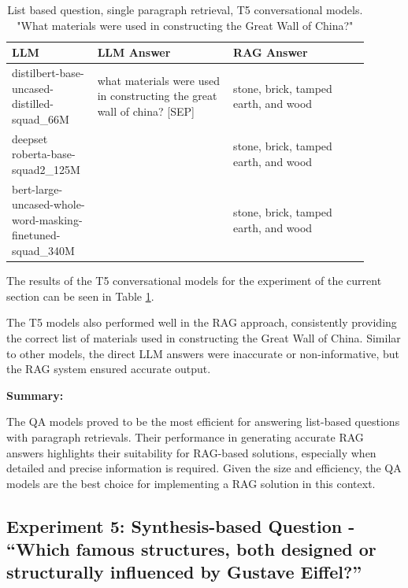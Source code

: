 \documentclass{wseas}
\begin{document}
\begin{table}[htbp]
  \centering
  \caption{List based question, single paragraph retrieval, T5 conversational models. "What materials were used in constructing the Great Wall of China?"}
  \label{tab:experiment_R_1_paragraph_Q_listBased_M_T5Models_table}  %
  \begin{tabular}{|p{0.20\linewidth}|p{0.35\linewidth}|p{0.35\linewidth}|}
    \hline
    \textbf{LLM} & \textbf{LLM Answer} & \textbf{RAG Answer} \\
    \hline
    distilbert-base-uncased-distilled-squad\_66M & what materials were used in constructing the great wall of china? {[}SEP{]} & stone, brick, tamped earth, and wood \\
    \hline
    deepset roberta-base-squad2\_125M & & stone, brick, tamped earth, and wood \\
    \hline
    bert-large-uncased-whole-word-masking-finetuned-squad\_340M & & stone, brick, tamped earth, and wood \\
    \hline
  \end{tabular}
\end{table}

The results of the T5 conversational models for the experiment of the
current section can be seen in Table \ref{tab:experiment_R_1_paragraph_Q_listBased_M_T5Models_table}.

The T5 models also performed well in the RAG approach, consistently
providing the correct list of materials used in constructing the Great
Wall of China. Similar to other models, the direct LLM answers were
inaccurate or non-informative, but the RAG system ensured accurate
output.

\textbf{Summary:}


The QA models proved to be the most efficient for answering list-based
questions with paragraph retrievals. Their performance in generating
accurate RAG answers highlights their suitability for RAG-based
solutions, especially when detailed and precise information is required.
Given the size and efficiency, the QA models are the best choice for
implementing a RAG solution in this context.


\subsection{Experiment 5: Synthesis-based Question - ``Which famous
structures, both designed or structurally influenced by Gustave
Eiffel?''}
\end{document}
